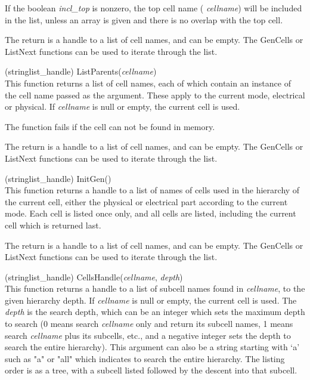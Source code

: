 \begin{description}
If the boolean {\it incl\_top} is nonzero, the top cell name ({\it
cellname\/}) will be included in the list, unless an array is given
and there is no overlap with the top cell.

The return is a handle to a list of cell names, and can be empty.  The
{\vt GenCells} or {\vt ListNext} functions can be used to iterate
through the list.

\item{(stringlist\_handle) \vt ListParents({\it cellname\/})}\\
This function returns a list of cell names, each of which contain an
instance of the cell name passed as the argument.  These apply to the
current mode, electrical or physical.  If {\it cellname} is null or
empty, the current cell is used.

The function fails if the cell can not be found in memory.  
  
The return is a handle to a list of cell names, and can be empty.  The
{\vt GenCells} or {\vt ListNext} functions can be used to iterate
through the list.

\item{(stringlist\_handle) \vt InitGen()}\\
This function returns a handle to a list of names of cells used in the
hierarchy of the current cell, either the physical or electrical part
according to the current mode.  Each cell is listed once only, and all
cells are listed, including the current cell which is returned last.

The return is a handle to a list of cell names, and can be empty.  The
{\vt GenCells} or {\vt ListNext} functions can be used to iterate
through the list.

\item{(stringlist\_handle) \vt CellsHandle({\it cellname\/},
 {\it depth\/})}\\
This function returns a handle to a list of subcell names found in
{\it cellname}, to the given hierarchy depth.  If {\it cellname} is null
or empty, the current cell is used.  The {\it depth} is the search
depth, which can be an integer which sets the maximum depth to search
(0 means search {\it cellname} only and return its subcell names, 1
means search {\it cellname} plus its subcells, etc., and a negative
integer sets the depth to search the entire hierarchy).  This argument
can also be a string starting with `a' such as {\vt "a"} or {\vt
"all"} which indicates to search the entire hierarchy.  The listing
order is as a tree, with a subcell listed followed by the descent into
that subcell.


\end{description}
